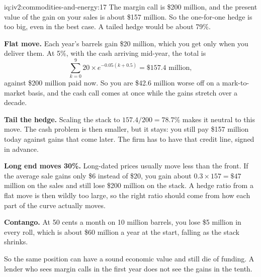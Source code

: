 \begin{solution}{iq:iv2:commodities-and-energy:17}
The margin call is \$200 million, and the present value of the gain on your sales is about \$157 million. So the one-for-one hedge is too big, even in the best case. A tailed hedge would be about 79\%.

\textbf{Flat move.} Each year's barrels gain \$20 million, which you get only when you deliver them. At 5\%, with the cash arriving mid-year, the total is
\[
\sum_{k = 0}^{9} 20 \times e^{-0.05(k + 0.5)} = \$157.4 \text{ million},
\]
against \$200 million paid now. So you are \$42.6 million worse off on a mark-to-market basis, and the cash call comes at once while the gains stretch over a decade.

\textbf{Tail the hedge.} Scaling the stack to $157.4/200 = 78.7\%$ makes it neutral to this move. The cash problem is then smaller, but it stays: you still pay \$157 million today against gains that come later. The firm has to have that credit line, signed in advance.

\textbf{Long end moves 30\%.} Long-dated prices usually move less than the front. If the average sale gains only \$6 instead of \$20, you gain about $0.3 \times 157 = \$47$ million on the sales and still lose \$200 million on the stack. A hedge ratio from a flat move is then wildly too large, so the right ratio should come from how each part of the curve actually moves.

\textbf{Contango.} At 50 cents a month on 10 million barrels, you lose \$5 million in every roll, which is about \$60 million a year at the start, falling as the stack shrinks.

So the same position can have a sound economic value and still die of funding. A lender who sees margin calls in the first year does not see the gains in the tenth.

\end{solution}

